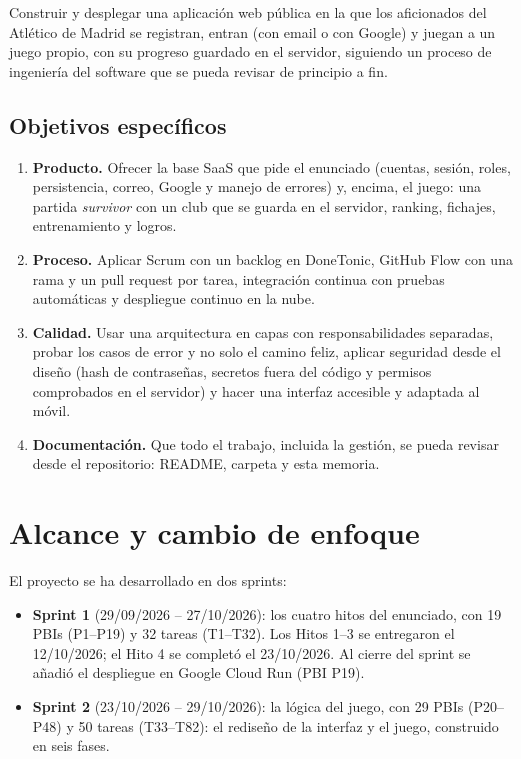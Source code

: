Construir y desplegar una aplicación web pública en la que los aficionados del Atlético de Madrid se registran, entran (con email o con Google) y juegan a un juego propio, con su progreso guardado en el servidor, siguiendo un proceso de ingeniería del software que se pueda revisar de principio a fin.

\subsection{Objetivos específicos}

\begin{enumerate}
    \item \textbf{Producto.} Ofrecer la base SaaS que pide el enunciado (cuentas, sesión, roles, persistencia, correo, Google y manejo de errores) y, encima, el juego: una partida \textit{survivor} con un club que se guarda en el servidor, ranking, fichajes, entrenamiento y logros.
    \item \textbf{Proceso.} Aplicar Scrum con un backlog en DoneTonic, GitHub Flow con una rama y un pull request por tarea, integración continua con pruebas automáticas y despliegue continuo en la nube.
    \item \textbf{Calidad.} Usar una arquitectura en capas con responsabilidades separadas, probar los casos de error y no solo el camino feliz, aplicar seguridad desde el diseño (hash de contraseñas, secretos fuera del código y permisos comprobados en el servidor) y hacer una interfaz accesible y adaptada al móvil.
    \item \textbf{Documentación.} Que todo el trabajo, incluida la gestión, se pueda revisar desde el repositorio: README, carpeta  y esta memoria.
\end{enumerate}

\section{Alcance y cambio de enfoque}

El proyecto se ha desarrollado en dos sprints:

\begin{itemize}
    \item \textbf{Sprint 1} (29/09/2026 -- 27/10/2026): los cuatro hitos del enunciado, con 19 PBIs (P1--P19) y 32 tareas (T1--T32). Los Hitos 1--3 se entregaron el 12/10/2026; el Hito 4 se completó el 23/10/2026. Al cierre del sprint se añadió el despliegue en Google Cloud Run (PBI P19).
    \item \textbf{Sprint 2} (23/10/2026 -- 29/10/2026): la lógica del juego, con 29 PBIs (P20--P48) y 50 tareas (T33--T82): el rediseño de la interfaz y el juego, construido en seis fases.
\end{itemize}

